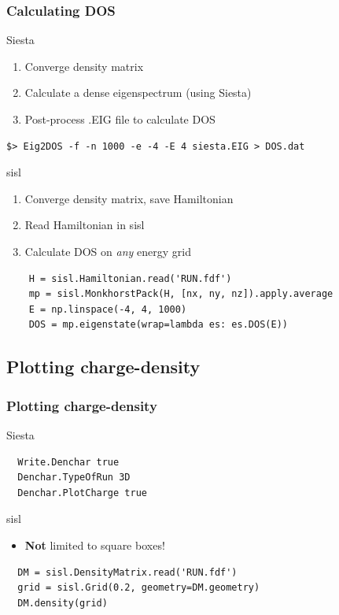 \begin{frame}[fragile]
  \frametitle{Calculating DOS}

  \begin{block}{Siesta}
    \begin{enumerate}
      \item Converge density matrix
      \item Calculate a dense eigenspectrum (using Siesta)
      \item Post-process .EIG file to calculate DOS
    \end{enumerate}
\begin{verbatim}
$> Eig2DOS -f -n 1000 -e -4 -E 4 siesta.EIG > DOS.dat
\end{verbatim}

  \end{block}

  \begin{block}{sisl}
    \begin{enumerate}
      \item Converge density matrix, save Hamiltonian
      \item Read Hamiltonian in sisl
      \item Calculate DOS on \emph{any} energy grid
    \end{enumerate}

\begin{verbatim}
    H = sisl.Hamiltonian.read('RUN.fdf')
    mp = sisl.MonkhorstPack(H, [nx, ny, nz]).apply.average
    E = np.linspace(-4, 4, 1000)
    DOS = mp.eigenstate(wrap=lambda es: es.DOS(E))
\end{verbatim}
  \end{block}

\end{frame}


\subsection{Plotting charge-density}

\begin{frame}[fragile]
  \frametitle{Plotting charge-density}

  \begin{block}{Siesta}
\begin{verbatim}
  Write.Denchar true
  Denchar.TypeOfRun 3D
  Denchar.PlotCharge true
\end{verbatim}

  \end{block}

  \begin{block}{sisl}

    \begin{itemize}
      \item \textbf{Not} limited to square boxes!
    \end{itemize}

\begin{verbatim}
  DM = sisl.DensityMatrix.read('RUN.fdf')
  grid = sisl.Grid(0.2, geometry=DM.geometry)
  DM.density(grid)
\end{verbatim}
  \end{block}

\end{frame}


